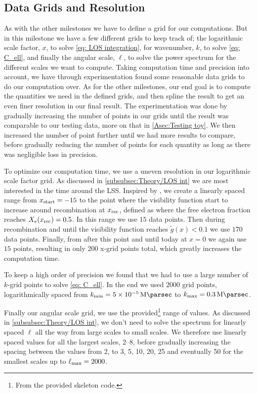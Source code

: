 \documentclass[10pt,a4paper]{article}
\providecommand{\gtilde}
{
  \ensuremath{
    \tilde{g}
  }
}
\begin{document}
\subsection{Data Grids and Resolution}
\label{subsec:Method/grid and resolution}
As with the other milestones we have to define a grid for our computations. But in this milestone we have a few different grids to keep track of; the logarithmic scale factor, $x$, to solve \cref{eq: LOS integration}, for wavenumber, $k$, to solve \cref{eq: C_ell}, and finally the angular scale, $\ell$, to solve the power spectrum for the different scales we want to compute. Taking computation time and precision into account, we have through experimentation found some reasonable data grids to do our computation over. As for the other milestones, our end goal is to compute the quantities we need in the defined grids, and then spline the result to get an even finer resolution in our final result. The experimentation was done by gradually increasing the number of points in our grids until the result was comparable to our testing data, more on that in \cref{Asec:Testing toy}. We then increased the number of point further until we had more results to compare, before gradually reducing the number of points for each quantity as long as there was negligible loss in precision.

To optimize our computation time, we use a uneven resolution in our logarithmic scale factor grid. As discussed in \cref{subsubsec:Theory/LOS int} we are most interested in the time around the LSS. Inspired by \cite{Calin}, we create a linearly spaced range from $x_{\rm{start}}= -15$ to the point where the visibility function start to increase around recombination at $x_{\rm{rec}}$, defined as where the free electron fraction reaches $X_e(x_{\rm{rec}}) = 0.5$. In this range we use $15$ data points. Then during recombination and until the visibility function reaches $\gtilde(x)<0.1$ we use $170$ data points. Finally, from after this point and until today at $x=0$ we again use $15$ points, resulting in only $200$ x-grid points total, which greatly increases the computation time.

To keep a high order of precision we found that we had to use a large number of $k$-grid points to solve \cref{eq: C_ell}. In the end we used $2000$ grid points, logarithmically spaced from $k_{\rm{min}} = \SI{5e-5}{\per\mega\parsec}$ to $k_{\rm{max}} = \SI{0.3}{\per\mega\parsec}$.

Finally our angular scale grid, we use the provided\footnote{From the provided skeleton code.} range of values. As discussed in \cref{subsubsec:Theory/LOS int}, we don't need to solve the spectrum for linearly spaced $\ell$ all the way from large scales to small scales. We therefore use linearly spaced values for all the largest scales, \numrange{2}{8}, before gradually increasing the spacing between the values from 2, to 3, 5, 10, 20, 25 and eventually 50 for the smallest scales up to $\ell_{\rm{max}} = 2000$.
\end{document}
